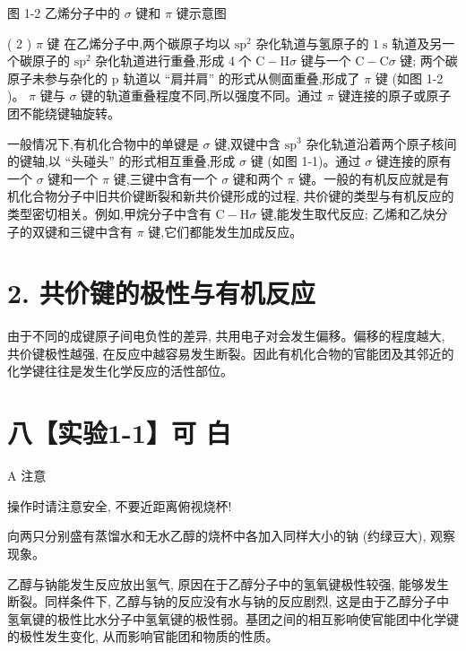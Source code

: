 \documentclass[10pt]{article}
\begin{document}
图 1-2 乙烯分子中的 \(\sigma\) 键和 \(\pi\) 键示意图

( 2 ) \(\pi\) 键 在乙烯分子中,两个碳原子均以 \({\mathrm{{sp}}}^{2}\) 杂化轨道与氢原子的 \(1\mathrm{\;s}\) 轨道及另一个碳原子的 \({\mathrm{{sp}}}^{2}\) 杂化轨道进行重叠,形成 4 个 \(\mathrm{C} - \mathrm{H}\sigma\) 键与一个 \(\mathrm{C} - \mathrm{C}\sigma\) 键; 两个碳原子未参与杂化的 \(\mathrm{p}\) 轨道以 “肩并肩” 的形式从侧面重叠,形成了 \(\pi\) 键 (如图 1-2 )。 \(\pi\) 键与 \(\sigma\) 键的轨道重叠程度不同,所以强度不同。通过 \(\pi\) 键连接的原子或原子团不能绕键轴旋转。

一般情况下,有机化合物中的单键是 \(\sigma\) 键,双键中含 \({\mathrm{{sp}}}^{3}\) 杂化轨道沿着两个原子核间的键轴,以 “头碰头” 的形式相互重叠,形成 \(\sigma\) 键 (如图 1-1)。通过 \(\sigma\) 键连接的原有一个 \(\sigma\) 键和一个 \(\pi\) 键,三键中含有一个 \(\sigma\) 键和两个 \(\pi\) 键。一般的有机反应就是有机化合物分子中旧共价键断裂和新共价键形成的过程, 共价键的类型与有机反应的类型密切相关。例如,甲烷分子中含有 \(\mathrm{C} - \mathrm{H}\sigma\) 键,能发生取代反应; 乙烯和乙炔分子的双键和三键中含有 \(\pi\) 键,它们都能发生加成反应。

\section*{2. 共价键的极性与有机反应}

由于不同的成键原子间电负性的差异, 共用电子对会发生偏移。偏移的程度越大, 共价键极性越强, 在反应中越容易发生断裂。因此有机化合物的官能团及其邻近的化学键往往是发生化学反应的活性部位。

\section*{八【实验1-1】可 白}

\begin{mdframed}

A 注意

操作时请注意安全, 不要近距离俯视烧杯!

\end{mdframed}

向两只分别盛有蒸馏水和无水乙醇的烧杯中各加入同样大小的钠 (约绿豆大), 观察现象。

乙醇与钠能发生反应放出氢气, 原因在于乙醇分子中的氢氧键极性较强, 能够发生断裂。同样条件下, 乙醇与钠的反应没有水与钠的反应剧烈, 这是由于乙醇分子中氢氧键的极性比水分子中氢氧键的极性弱。基团之间的相互影响使官能团中化学键的极性发生变化, 从而影响官能团和物质的性质。
\end{document}
